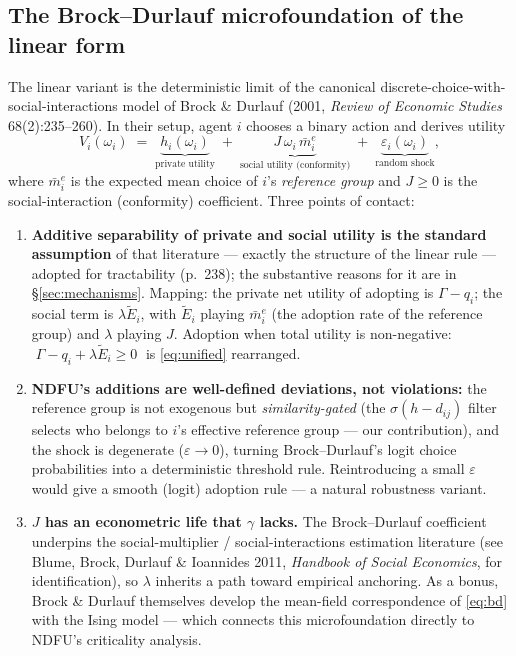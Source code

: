 \documentclass[11pt,a4paper]{article}
\newcommand{\Ee}{\tilde{E}}                 %
\begin{document}
\subsection{The Brock--Durlauf microfoundation of the linear form}
\label{sec:brockdurlauf}

The linear variant is the deterministic limit of the canonical
discrete-choice-with-social-interactions model of Brock \& Durlauf (2001,
\emph{Review of Economic Studies} 68(2):235--260). In their setup, agent $i$ chooses a
binary action and derives utility
\begin{equation}
  V_i(\omega_i) \;=\;
  \underbrace{h_i(\omega_i)}_{\text{private utility}}
  \;+\;
  \underbrace{J\, \omega_i\, \bar{m}_i^{e}}_{\text{social utility (conformity)}}
  \;+\;
  \underbrace{\varepsilon_i(\omega_i)}_{\text{random shock}},
  \label{eq:bd}
\end{equation}
where $\bar{m}_i^{e}$ is the expected mean choice of $i$'s \emph{reference group} and
$J \ge 0$ is the social-interaction (conformity) coefficient. Three points of contact:

\begin{enumerate}
  \item \textbf{Additive separability of private and social utility is the standard
    assumption} of that literature --- exactly the structure of the linear rule --- adopted
    for tractability (p.~238); the substantive reasons for it are in
    \S\ref{sec:mechanisms}. Mapping:
    the private net utility of adopting is $\Gamma - q_i$; the social term is
    $\lambda \Ee_i$, with $\Ee_i$ playing $\bar{m}_i^{e}$ (the adoption rate of the
    reference group) and $\lambda$ playing $J$. Adoption when total utility is
    non-negative:
    $\;\Gamma - q_i + \lambda \Ee_i \ge 0\;$ is \eqref{eq:unified} rearranged.
  \item \textbf{NDFU's additions are well-defined deviations, not violations:} the
    reference group is not exogenous but \emph{similarity-gated} (the $\sigma(h -
    d_{ij})$ filter selects who belongs to $i$'s effective reference group --- our
    contribution), and the shock is degenerate ($\varepsilon \to 0$), turning
    Brock--Durlauf's logit choice probabilities into a deterministic threshold rule.
    Reintroducing a small $\varepsilon$ would give a smooth (logit) adoption rule --- a
    natural robustness variant.
  \item \textbf{$J$ has an econometric life that $\gamma$ lacks.} The Brock--Durlauf
    coefficient underpins the social-multiplier / social-interactions estimation
    literature (see Blume, Brock, Durlauf \& Ioannides 2011, \emph{Handbook of Social
    Economics}, for identification), so $\lambda$ inherits a path toward empirical
    anchoring. As a bonus, Brock \& Durlauf themselves develop the mean-field
    correspondence of \eqref{eq:bd} with the Ising model --- which connects this
    microfoundation directly to NDFU's criticality analysis.
\end{enumerate}
\end{document}
